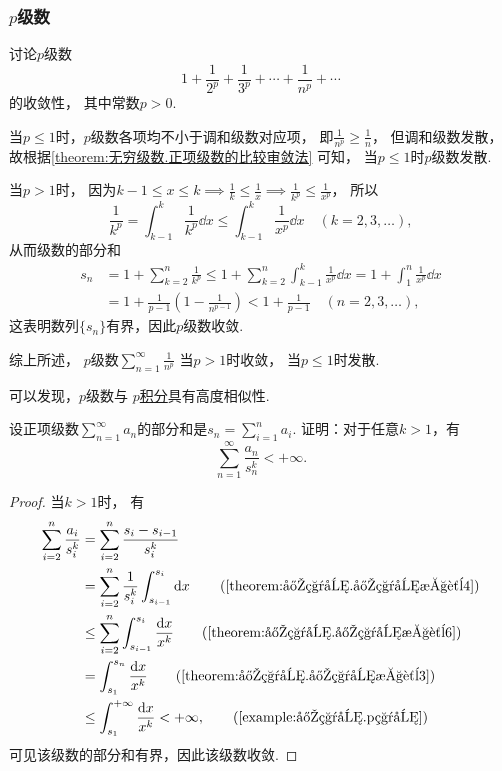 \subsubsection{\texorpdfstring{\(p\)}{p}级数}
\begin{proposition}\label{example:无穷级数.p级数的收敛性}
讨论\(p\)级数\[
	1+\frac{1}{2^p}+\frac{1}{3^p}+\dotsb+\frac{1}{n^p}+\dotsb
\]的收敛性，
其中常数\(p>0\).
\begin{solution}
当\(p \leq 1\)时，\(p\)级数各项均不小于调和级数对应项，
即\(\frac{1}{n^p} \geq \frac{1}{n}\)，
但调和级数发散，
故根据\cref{theorem:无穷级数.正项级数的比较审敛法} 可知，
当\(p \leq 1\)时\(p\)级数发散.

当\(p > 1\)时，
因为\(k-1
\leq x
\leq k \implies \frac{1}{k}
\leq \frac{1}{x} \implies \frac{1}{k^p}
\leq \frac{1}{x^p}\)，
所以\[
	\frac{1}{k^p}
	= \int_{k-1}^k \frac{1}{k^p} \dd{x}
	\leq \int_{k-1}^k \frac{1}{x^p} \dd{x}
	\quad(k=2,3,\dotsc),
\]
从而级数的部分和
\begin{align*}
	s_n &= 1 + \sum_{k=2}^n{\frac{1}{k^p}}
	\leq 1 + \sum_{k=2}^n{ \int_{k-1}^k{\frac{1}{x^p}\dd{x}} }
	= 1 + \int_1^n{\frac{1}{x^p}\dd{x}} \\
	&= 1 + \frac{1}{p-1}\left(1-\frac{1}{n^{p-1}}\right)
	< 1 + \frac{1}{p-1}
	\quad(n=2,3,\dotsc),
\end{align*}
这表明数列\(\{s_n\}\)有界，因此\(p\)级数收敛.

综上所述，{\color{red} \(p\)级数\(\sum_{n=1}^\infty \frac{1}{n^p}\)
当\(p > 1\)时收敛，
当\(p \leq 1\)时发散.}
\end{solution}
\end{proposition}
可以发现，\(p\)级数与
\hyperref[example:定积分.p积分]{\(p\)积分}具有高度相似性.

\begin{example}
设正项级数\(\sum_{n=1}^\infty a_n\)的部分和是\(s_n = \sum_{i=1}^n a_i\).
证明：对于任意\(k>1\)，有\[
	\sum_{n=1}^\infty \frac{a_n}{s_n^k} < +\infty.
\]
\begin{proof}
当\(k>1\)时，
有\begin{align*}
	\sum_{i=2}^n \frac{a_i}{s_i^k}
	&= \sum_{i=2}^n \frac{s_i-s_{i-1}}{s_i^k} \\
	&= \sum_{i=2}^n \frac{1}{s_i^k} \int_{s_{i-1}}^{s_i} \dd{x}
			\tag{\cref{theorem:定积分.定积分性质4}} \\
	&\leq \sum_{i=2}^n \int_{s_{i-1}}^{s_i} \frac{\dd{x}}{x^k}
			\tag{\cref{theorem:定积分.定积分性质6}} \\
	&= \int_{s_1}^{s_n} \frac{\dd{x}}{x^k}
			\tag{\cref{theorem:定积分.定积分性质3}} \\
	&\leq \int_{s_1}^{+\infty} \frac{\dd{x}}{x^k}
	< +\infty,
			\tag{\cref{example:定积分.p积分}}
\end{align*}
可见该级数的部分和有界，因此该级数收敛.
\end{proof}
\end{example}

